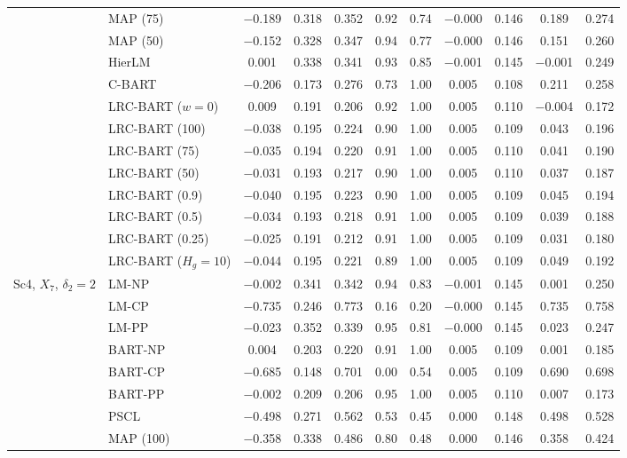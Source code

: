 \documentclass[11pt]{article}
\theoremstyle{definition}
\theoremstyle{plain}
\begin{document}
\begin{center}
\begin{longtable}{llccccccccc}
& MAP (75) & $-$0.189 & 0.318 & 0.352 & 0.92 & 0.74 & $-$0.000 & 0.146 & 0.189 & 0.274 \\
& MAP (50) & $-$0.152 & 0.328 & 0.347 & 0.94 & 0.77 & $-$0.000 & 0.146 & 0.151 & 0.260 \\
& HierLM & 0.001 & 0.338 & 0.341 & 0.93 & 0.85 & $-$0.001 & 0.145 & $-$0.001 & 0.249 \\
& C-BART & $-$0.206 & 0.173 & 0.276 & 0.73 & 1.00 & 0.005 & 0.108 & 0.211 & 0.258 \\
& LRC-BART ($w=0$) & 0.009 & 0.191 & 0.206 & 0.92 & 1.00 & 0.005 & 0.110 & $-$0.004 & 0.172 \\
& LRC-BART (100) & $-$0.038 & 0.195 & 0.224 & 0.90 & 1.00 & 0.005 & 0.109 & 0.043 & 0.196 \\
& LRC-BART (75) & $-$0.035 & 0.194 & 0.220 & 0.91 & 1.00 & 0.005 & 0.110 & 0.041 & 0.190 \\
& LRC-BART (50) & $-$0.031 & 0.193 & 0.217 & 0.90 & 1.00 & 0.005 & 0.110 & 0.037 & 0.187 \\
& LRC-BART (0.9) & $-$0.040 & 0.195 & 0.223 & 0.90 & 1.00 & 0.005 & 0.109 & 0.045 & 0.194 \\
& LRC-BART (0.5) & $-$0.034 & 0.193 & 0.218 & 0.91 & 1.00 & 0.005 & 0.109 & 0.039 & 0.188 \\
& LRC-BART (0.25) & $-$0.025 & 0.191 & 0.212 & 0.91 & 1.00 & 0.005 & 0.109 & 0.031 & 0.180 \\
& LRC-BART ($H_g=10$) & $-$0.044 & 0.195 & 0.221 & 0.89 & 1.00 & 0.005 & 0.109 & 0.049 & 0.192 \\
\midrule
\multirow{20}{*}{Sc4, $X_7$, $\delta_2=2$} & LM-NP & $-$0.002 & 0.341 & 0.342 & 0.94 & 0.83 & $-$0.001 & 0.145 & 0.001 & 0.250 \\
& LM-CP & $-$0.735 & 0.246 & 0.773 & 0.16 & 0.20 & $-$0.000 & 0.145 & 0.735 & 0.758 \\
& LM-PP & $-$0.023 & 0.352 & 0.339 & 0.95 & 0.81 & $-$0.000 & 0.145 & 0.023 & 0.247 \\
& BART-NP & 0.004 & 0.203 & 0.220 & 0.91 & 1.00 & 0.005 & 0.109 & 0.001 & 0.185 \\
& BART-CP & $-$0.685 & 0.148 & 0.701 & 0.00 & 0.54 & 0.005 & 0.109 & 0.690 & 0.698 \\
& BART-PP & $-$0.002 & 0.209 & 0.206 & 0.95 & 1.00 & 0.005 & 0.110 & 0.007 & 0.173 \\
& PSCL & $-$0.498 & 0.271 & 0.562 & 0.53 & 0.45 & 0.000 & 0.148 & 0.498 & 0.528 \\
& MAP (100) & $-$0.358 & 0.338 & 0.486 & 0.80 & 0.48 & 0.000 & 0.146 & 0.358 & 0.424 \\

\end{longtable}
\end{center}
\end{document}
